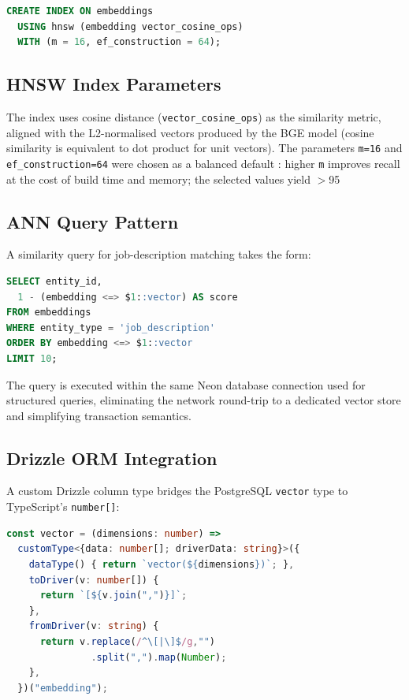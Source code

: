 \documentclass[conference]{IEEEtran}
\begin{document}
\begin{lstlisting}[language=SQL, caption={HNSW index creation.}]
CREATE INDEX ON embeddings
  USING hnsw (embedding vector_cosine_ops)
  WITH (m = 16, ef_construction = 64);
\end{lstlisting}

\subsection{HNSW Index Parameters}

The index uses cosine distance (\texttt{vector\_cosine\_ops}) as the
similarity metric, aligned with the L2-normalised vectors produced by
the BGE model (cosine similarity is equivalent to dot product for unit
vectors). The parameters \texttt{m=16} and \texttt{ef\_construction=64}
were chosen as a balanced default \cite{malkov2018hnsw}: higher \texttt{m}
improves recall at the cost of build time and memory; the selected values
yield $>$95%

\subsection{ANN Query Pattern}

A similarity query for job-description matching takes the form:

\begin{lstlisting}[language=SQL, caption={ANN similarity query.}]
SELECT entity_id,
  1 - (embedding <=> $1::vector) AS score
FROM embeddings
WHERE entity_type = 'job_description'
ORDER BY embedding <=> $1::vector
LIMIT 10;
\end{lstlisting}

The query is executed within the same Neon database connection used for
structured queries, eliminating the network round-trip to a dedicated
vector store and simplifying transaction semantics.

\subsection{Drizzle ORM Integration}

A custom Drizzle column type bridges the PostgreSQL \texttt{vector} type to
TypeScript's \texttt{number[]}:

\begin{lstlisting}[language=TypeScript, caption={Custom Drizzle vector column.}]
const vector = (dimensions: number) =>
  customType<{data: number[]; driverData: string}>({
    dataType() { return `vector(${dimensions})`; },
    toDriver(v: number[]) {
      return `[${v.join(",")}]`;
    },
    fromDriver(v: string) {
      return v.replace(/^\[|\]$/g,"")
               .split(",").map(Number);
    },
  })("embedding");
\end{lstlisting}
\end{document}

